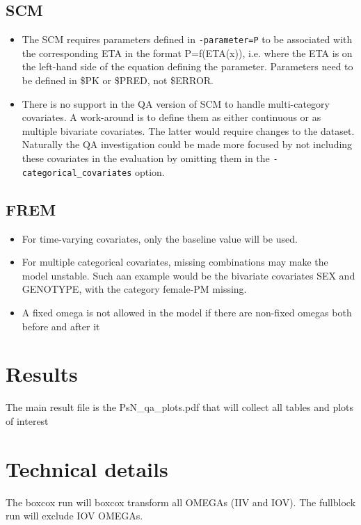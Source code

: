\subsection{SCM}
\begin{itemize}
	\item The SCM requires parameters defined in \verb|-parameter=P| to be associated with the corresponding ETA in the format P=f(ETA(x)), i.e. where the ETA is on the left-hand side of the equation defining the parameter. Parameters need to be defined in \$PK or \$PRED, not \$ERROR.

	\item There is no support in the QA version of SCM to handle multi-category covariates. A work-around is to define them as either continuous or as multiple bivariate covariates. The latter would require changes to the dataset. Naturally the QA investigation could be made more focused by not including these covariates in the evaluation by omitting them in the \verb|-categorical_covariates| option.
\end{itemize}

\subsection{FREM}
\begin{itemize}
	\item For time-varying covariates, only the baseline value will be used.
	\item For multiple categorical covariates, missing combinations may make the model unstable. Such aan example would be the bivariate covariates SEX and GENOTYPE, with the category female-PM missing.
	\item A fixed omega is not allowed in the model if there are non-fixed omegas both before and after it
\end{itemize}


\section{Results}

The main result file is the PsN\_qa\_plots.pdf that will collect all tables and plots of interest

\section{Technical details}

The boxcox run will boxcox transform all OMEGAs (IIV and IOV). The fullblock run will exclude IOV OMEGAs.



